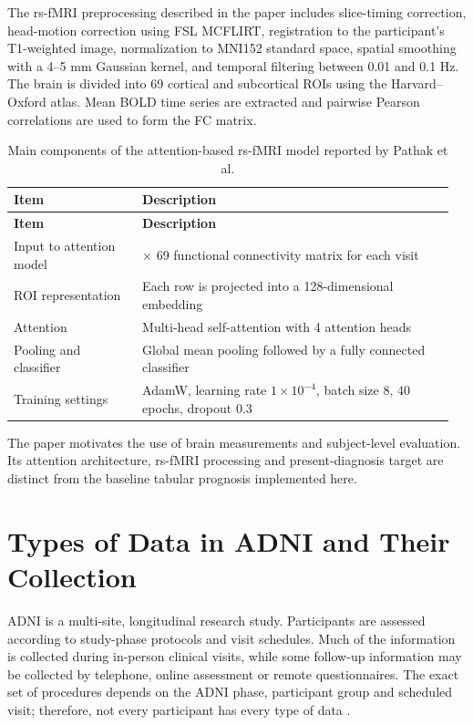 \documentclass[11pt,a4paper]{article}
\begin{document}
The rs-fMRI preprocessing described in the paper includes slice-timing correction, head-motion correction using FSL MCFLIRT, registration to the participant's T1-weighted image, normalization to MNI152 standard space, spatial smoothing with a 4--5 mm Gaussian kernel, and temporal filtering between 0.01 and 0.1 Hz. The brain is divided into 69 cortical and subcortical ROIs using the Harvard--Oxford atlas. Mean BOLD time series are extracted and pairwise Pearson correlations are used to form the FC matrix.

\begingroup\small\renewcommand{\arraystretch}{1.16}
\begin{longtable}{@{}>{\raggedright\arraybackslash}p{0.28\linewidth}>{\raggedright\arraybackslash}p{0.68\linewidth}@{}}
\caption{Main components of the attention-based rs-fMRI model reported by Pathak et al. \cite{pathak}}\\
\toprule \textbf{Item} & \textbf{Description}\\\midrule\endfirsthead
\toprule \textbf{Item} & \textbf{Description}\\\midrule\endhead
\midrule\endfoot\bottomrule\endlastfoot
Input to attention model & 69 \ensuremath{\times} 69 functional connectivity matrix for each visit\\
ROI representation & Each row is projected into a 128-dimensional embedding\\
Attention & Multi-head self-attention with 4 attention heads\\
Pooling and classifier & Global mean pooling followed by a fully connected classifier\\
Training settings & AdamW, learning rate $1\times 10^{-4}$, batch size 8, 40 epochs, dropout 0.3\\
\end{longtable}\endgroup
The paper motivates the use of brain measurements and subject-level evaluation. Its attention architecture, rs-fMRI processing and present-diagnosis target are distinct from the baseline tabular prognosis implemented here.

\section{Types of Data in ADNI and Their Collection}
ADNI is a multi-site, longitudinal research study. Participants are assessed according to study-phase protocols and visit schedules. Much of the information is collected during in-person clinical visits, while some follow-up information may be collected by telephone, online assessment or remote questionnaires. The exact set of procedures depends on the ADNI phase, participant group and scheduled visit; therefore, not every participant has every type of data \cite{collection}.
\end{document}
